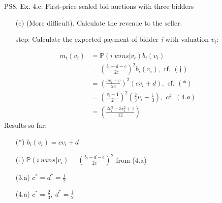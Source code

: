 \begin{frame}{PS8, Ex. 4.c: First-price sealed bid auctions with three bidders}
    \begin{itemize}
      \item[(c)] (More difficult). Calculate the revenue to the seller.
    \end{itemize}
    \vspace{-8pt}
    \begin{multicols}{2}
      \begin{itemize}
        \item[\nth{1} step:] Calculate the expected payment of bidder \textit{i} with valuation $v_i$:
      \end{itemize}
      \vspace{-4pt}
      \begin{align*}
        m_i(v_i)&=\mathbb{P}(i\ wins|v_i)b_i(v_i)\\
                &=\left(\frac{b_i-d-c}{2c}\right)^2b_i(v_i),\text{ cf. }(\dagger)\\
                &=\left(\frac{cv_i-c}{2c}\right)^2(cv_i+d),\text{ cf. }(*)\\
                &=\left(\frac{v_i-1}{2}\right)^2\left(\frac{2}{3}v_i+\frac{1}{3}\right),\text{ cf. }(4.a)\\
                &=\left(\frac{2v_i^3-3v_i^2+1}{12}\right)
      \end{align*}
      \vfill\null\columnbreak
      Results so far:
      \vspace{-6pt}
      \begin{itemize}
        \item[($*$)] $b_i(v_i) = cv_i+d$
        \item[($\dagger$)] $\mathbb{P}(i\ wins|v_i)=\left(\frac{b_i-d-c}{2c}\right)^2$ from (4.a)
        \item[(3.a)] $c^*=d^*=\frac{1}{2}$
        \item[(4.a)] $c^*=\frac{2}{3},\ d^*=\frac{1}{2}$
      \end{itemize}
      \vfill\null
    \end{multicols}
    \vfill\null
\end{frame}
